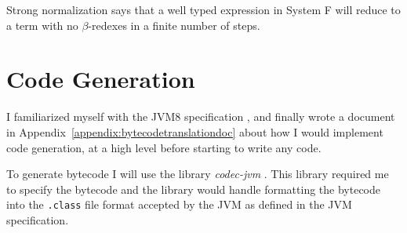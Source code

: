 \documentclass[float=false, crop=false]{standalone}
\begin{document}
\begin{displayquote} Strong normalization says that a well typed expression in System F will
reduce to a term with no $\beta$-redexes in a finite number of steps.
\end{displayquote}

\section{Code Generation}

I familiarized myself with the JVM8 specification \cite{jvm-spec8}, and finally wrote a document in Appendix~\ref{appendix:bytecodetranslationdoc} 
about how I would implement code generation, 
at a high level before starting to write any code.

To generate bytecode I will use the library \textit{codec-jvm} \cite{codec-jvm-link}. This library 
required me to specify the bytecode and the library would handle formatting the bytecode into
the \texttt{.class} file format accepted by the JVM as defined in the JVM specification. 
\end{document}
